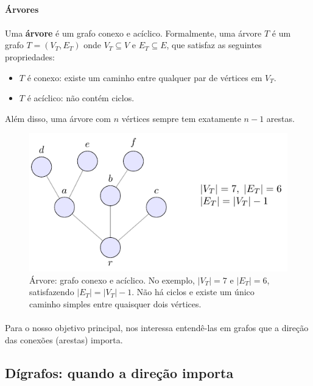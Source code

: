 \documentclass[12pt,a4paper]{article}
\begin{document}
\paragraph{Árvores}
\paragraph{}Uma \textbf{árvore} é um grafo conexo e acíclico. Formalmente, uma árvore \(T\) é um grafo \(T = (V_T, E_T)\) onde \(V_T \subseteq V\) e \(E
_T \subseteq E\), que satisfaz as seguintes propriedades:
\begin{itemize}
    \item \(T\) é conexo: existe um caminho entre qualquer par de vértices em \(V_T\).
    \item \(T\) é acíclico: não contém ciclos.
\end{itemize}
Além disso, uma árvore com \(n\) vértices sempre tem exatamente \(n-1\) arestas.


\begin{figure}[H]
    \centering
    \includegraphics[width=0.9\linewidth]{figures/fig_arvore.pdf}

    \caption{Árvore: grafo conexo e acíclico. No exemplo, $|V_T|=7$ e $|E_T|=6$, satisfazendo $|E_T|=|V_T|-1$. Não há ciclos e existe um único caminho simples entre quaisquer dois vértices.}
    \label{fig:arvore}\end{figure}


\paragraph{}
Para o nosso objetivo principal, nos interessa entendê-las em grafos que a direção das conexões (arestas) importa.

\subsection{Dígrafos: quando a direção importa}
\end{document}
